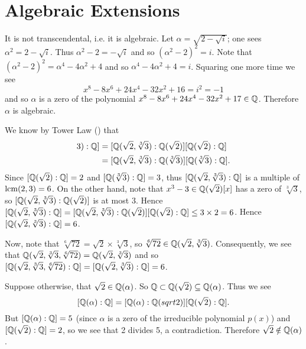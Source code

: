 \section{Algebraic Extensions}
\begin{questions}
    \item It is not transcendental, i.e. it is algebraic. Let $\alpha = \sqrt{2-\sqrt{i}}$; one sees $\alpha^2 = 2 - \sqrt{i}$. Thus $\alpha^2 - 2 = -\sqrt{i}$ and so $(\alpha^2-2)^2 = i$. Note that $(\alpha^2 - 2)^2 = \alpha^4 - 4\alpha^2 + 4$ and so $\alpha^4 - 4\alpha^2 + 4 = i$. Squaring one more time we see
    \[
        x^8 - 8x^6 + 24x^4 - 32x^2 + 16 = i^2 = -1
    \]
    and so $\alpha$ is a zero of the polynomial $x^8 - 8x^6 + 24x^4 - 32x^2 + 17 \in \mathbb{Q}$. Therefore $\alpha$ is algebraic.

    \item We know by Tower Law () that
    \begin{align*}
        [\Q(\sqrt2, \sqrt[3]3): \Q] &= [\Q(\sqrt2, \sqrt[3]3): \Q(\sqrt2)][\Q(\sqrt2):\Q]\\
        &= [\Q(\sqrt2, \sqrt[3]3): \Q(\sqrt[3]3)][\Q(\sqrt[3]3):\Q].
    \end{align*}
    Since $[\mathbb{Q}(\sqrt2):\mathbb{Q}] = 2$ and $[\mathbb{Q}(\sqrt[3]3):\mathbb{Q}] = 3$, thus $[\mathbb{Q}(\sqrt2, \sqrt[3]3): \mathbb{Q}]$ is a multiple of $\mathrm{lcm}(2, 3) = 6$. On the other hand, note that $x^3 - 3 \in \mathbb{Q}(\sqrt2)[x]$ has a zero of $\sqrt[3]3$, so $[\mathbb{Q}(\sqrt2, \sqrt[3]3): \mathbb{Q}(\sqrt2)]$ is at most 3. Hence $[\mathbb{Q}(\sqrt2, \sqrt[3]3): \mathbb{Q}] = [\mathbb{Q}(\sqrt2, \sqrt[3]3): \mathbb{Q}(\sqrt2)][\mathbb{Q}(\sqrt2):\mathbb{Q}] \leq 3 \times 2 = 6$. Hence $[\mathbb{Q}(\sqrt2, \sqrt[3]3): \mathbb{Q}] = 6$.

    Now, note that $\sqrt[6]{72} = \sqrt2 \times \sqrt[3]3$, so $\sqrt[6]{72} \in \mathbb{Q}(\sqrt2, \sqrt[3]3)$. Consequently, we see that $\mathbb{Q}(\sqrt2, \sqrt[3]3, \sqrt[6]{72}) = \mathbb{Q}(\sqrt2, \sqrt[3]3)$ and so $[\mathbb{Q}(\sqrt2, \sqrt[3]3, \sqrt[6]{72}):\mathbb{Q}] = [\mathbb{Q}(\sqrt2, \sqrt[3]3): \mathbb{Q}] = 6$.

    \item Suppose otherwise, that $\sqrt2 \in \mathbb{Q}(\alpha)$. So $\mathbb{Q} \subset \mathbb{Q}(\sqrt2) \subseteq \mathbb{Q}(\alpha)$. Thus we see
    \[
        [\mathbb{Q}(\alpha): \mathbb{Q}] = [\mathbb{Q}(\alpha):\mathbb{Q}(sqrt2)][\mathbb{Q}(\sqrt2):\mathbb{Q}].
    \]
    But $[\mathbb{Q}(\alpha): \mathbb{Q}] = 5$ (since $\alpha$ is a zero of the irreducible polynomial $p(x)$) and $[\mathbb{Q}(\sqrt2):\mathbb{Q}] = 2$, so we see that 2 divides 5, a contradiction. Therefore $\sqrt2 \notin \mathbb{Q}(\alpha)$.


\end{questions}
